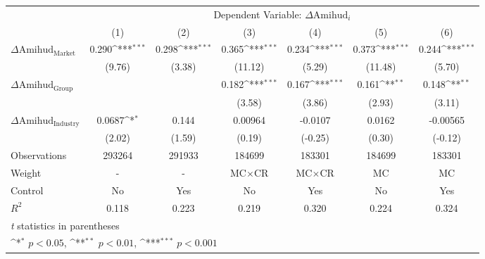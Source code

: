 {
\def\sym#1{\ifmmode^{#1}\else\(^{#1}\)\fi}
\begin{tabular}{l*{6}{c}}
\hline\hline
                    &\multicolumn{6}{c}{Dependent Variable: $\Delta \text{Amihud}_{i} $ }                                                               \\\cmidrule(lr){2-7}
                    &\multicolumn{1}{c}{(1)}         &\multicolumn{1}{c}{(2)}         &\multicolumn{1}{c}{(3)}         &\multicolumn{1}{c}{(4)}         &\multicolumn{1}{c}{(5)}         &\multicolumn{1}{c}{(6)}         \\
\hline
 $ \Delta \text{Amihud}_{\text{Market}} $ &       0.290\sym{***}&       0.298\sym{***}&       0.365\sym{***}&       0.234\sym{***}&       0.373\sym{***}&       0.244\sym{***}\\
                    &      (9.76)         &      (3.38)         &     (11.12)         &      (5.29)         &     (11.48)         &      (5.70)         \\
[1em]
 $ \Delta \text{Amihud}_{\text{Group}} $ &                     &                     &       0.182\sym{***}&       0.167\sym{***}&       0.161\sym{**} &       0.148\sym{**} \\
                    &                     &                     &      (3.58)         &      (3.86)         &      (2.93)         &      (3.11)         \\
[1em]
 $ \Delta \text{Amihud}_{\text{Industry}} $ &      0.0687\sym{*}  &       0.144         &     0.00964         &     -0.0107         &      0.0162         &    -0.00565         \\
                    &      (2.02)         &      (1.59)         &      (0.19)         &     (-0.25)         &      (0.30)         &     (-0.12)         \\
\hline
Observations        &      293264         &      291933         &      184699         &      183301         &      184699         &      183301         \\
Weight              &           -         &           -         & $ \text{MC} \times \text{CR} $          & $ \text{MC} \times \text{CR} $          & $ \text{MC} $          & $ \text{MC} $          \\
Control             &          No         &         Yes         &          No         &         Yes         &          No         &         Yes         \\
$ R^2 $             &       0.118         &       0.223         &       0.219         &       0.320         &       0.224         &       0.324         \\
\hline\hline
\multicolumn{7}{l}{\footnotesize \textit{t} statistics in parentheses}\\
\multicolumn{7}{l}{\footnotesize \sym{*} \(p<0.05\), \sym{**} \(p<0.01\), \sym{***} \(p<0.001\)}\\
\end{tabular}
}
